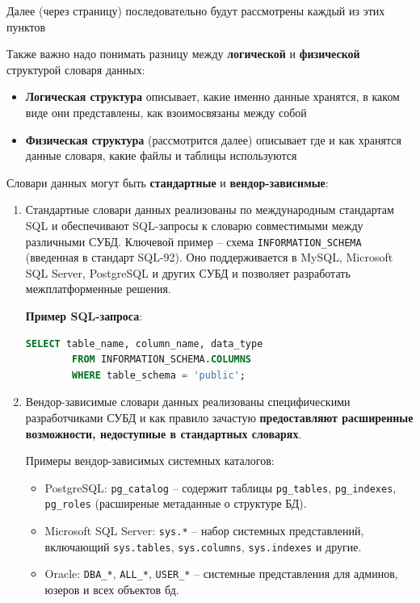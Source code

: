 Далее (через страницу) последовательно будут рассмотрены каждый из этих пунктов

Также важно надо понимать разницу между \textbf{логической} и \textbf{физической} структурой словаря данных:

\begin{itemize}
    \item \textbf{Логическая структура} описывает, какие именно данные хранятся, в каком виде они представлены, как взоимосвязаны между собой
    \item \textbf{Физическая структура} (рассмотрится далее) описывает где и как хранятся данные словаря, какие файлы и таблицы используются
\end{itemize}

Словари данных могут быть \textbf{стандартные} и \textbf{вендор-зависимые}:

\begin{enumerate}
 
    \item Стандартные словари данных реализованы по международным стандартам SQL и обеспечивают SQL-запросы к словарю совместимыми между различными СУБД. Ключевой пример – схема \texttt{INFORMATION\_SCHEMA} (введенная в стандарт SQL-92). Оно поддерживается в MySQL, Microsoft SQL Server, PostgreSQL и других СУБД и позволяет разработать межплатформенные решения.

        \textbf{Пример SQL-запроса}:
        \begin{lstlisting}[language=SQL]
        SELECT table_name, column_name, data_type 
        FROM INFORMATION_SCHEMA.COLUMNS 
        WHERE table_schema = 'public';
        \end{lstlisting}

    \item Вендор-зависимые словари данных реализованы специфическими разработчиками СУБД и как правило зачастую \textbf{предоставляют расширенные возможности, недоступные в стандартных словарях}. 

    Примеры вендор-зависимых системных каталогов:
    \begin{itemize}
        \item PostgreSQL: \texttt{pg\_catalog} – содержит таблицы \texttt{pg\_tables}, \texttt{pg\_indexes}, \texttt{pg\_roles} (расширеные метаданные о структуре БД).
        \item Microsoft SQL Server: \texttt{sys.*} – набор системных представлений, включающий \texttt{sys.tables}, \texttt{sys.columns}, \texttt{sys.indexes} и другие.
        \item Oracle: \texttt{DBA\_*}, \texttt{ALL\_*}, \texttt{USER\_*} – системные представления для админов, юзеров и всех объектов бд.
    \end{itemize}

\end{enumerate}

